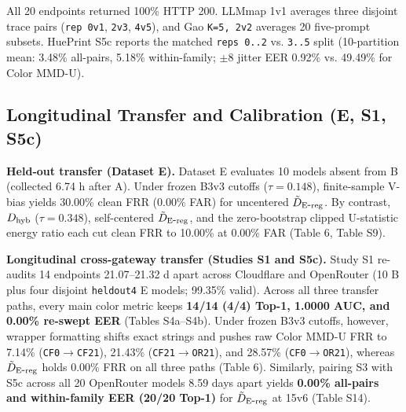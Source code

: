\begin{table}[t]
\begin{tabular}
\bottomrule
\end{tabular}
\par\vspace{3pt}\begin{minipage}{\textwidth}\footnotesize All 20 endpoints returned 100\% HTTP 200. LLMmap 1v1 averages three disjoint trace pairs (\texttt{rep 0v1}, \texttt{2v3}, \texttt{4v5}), and Gao \texttt{K=\allowbreak{}5, 2v2} averages 20 five-prompt subsets. HuePrint S5c reports the matched \texttt{reps 0.\allowbreak{}.\allowbreak{}2} vs. \texttt{3.\allowbreak{}.\allowbreak{}5} split (10-partition mean: 3.48\% all-pairs, 5.18\% within-family; $\pm 8$ jitter EER 0.92\% vs. 49.49\% for Color MMD-U).\end{minipage}
\end{table}

\subsection{Longitudinal Transfer and Calibration (E, S1, S5c)}

\textbf{Held-out transfer (Dataset E).} Dataset E evaluates 10 models absent from B (collected 6.74 h after A). Under frozen B3v3 cutoffs ($\tau = 0.148$), finite-sample V-bias yields 30.00\% clean FRR (0.00\% FAR) for uncentered $\tilde D_{\mathrm{E\mbox{-}reg}}{}$. By contrast, $D_{\mathrm{hyb}}{}$ ($\tau = 0.348$), self-centered $\tilde D_{\mathrm{E\mbox{-}reg}}{}$, and the zero-bootstrap clipped U-statistic energy ratio each cut clean FRR to 10.00\% at 0.00\% FAR (Table 6, Table S9).


\textbf{Longitudinal cross-gateway transfer (Studies S1 and S5c).} Study S1 re-audits 14 endpoints 21.07--21.32 d apart across Cloudflare and OpenRouter (10 B plus four disjoint \texttt{heldout4} E models; 99.35\% valid). Across all three transfer paths, every main color metric keeps \textbf{14/14 (4/4) Top-1, 1.0000 AUC, and 0.00\% re-swept EER} (Tables S4a--S4b). Under frozen B3v3 cutoffs, however, wrapper formatting shifts exact strings and pushes raw Color MMD-U FRR to 7.14\% (\texttt{CF0\ensuremath{\rightarrow}CF21}), 21.43\% (\texttt{CF21\ensuremath{\rightarrow}OR21}), and 28.57\% (\texttt{CF0\ensuremath{\rightarrow}OR21}), whereas $\tilde D_{\mathrm{E\mbox{-}reg}}{}$ holds 0.00\% FRR on all three paths (Table 6). Similarly, pairing S3 with S5c across all 20 OpenRouter models 8.59 days apart yields \textbf{0.00\% all-pairs and within-family EER (20/20 Top-1)} for $\tilde D_{\mathrm{E\mbox{-}reg}}{}$ at 15v6 (Table S14).


